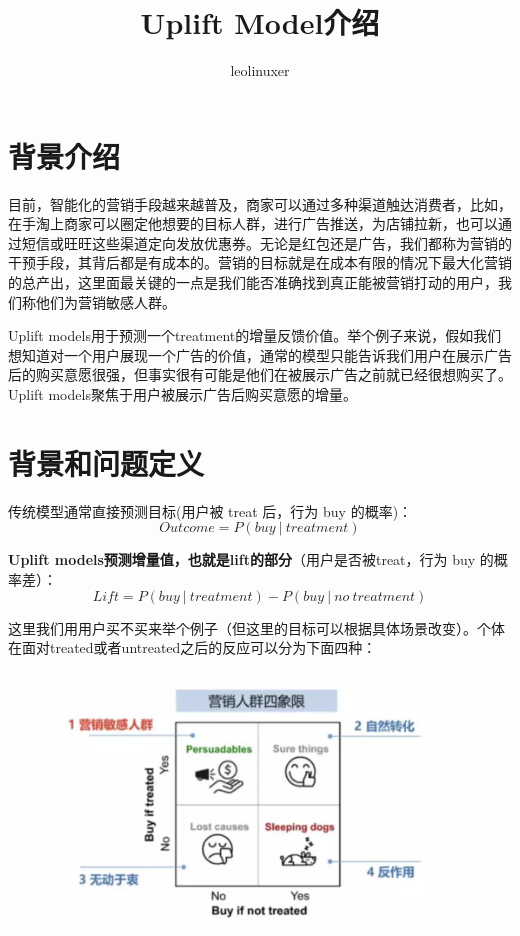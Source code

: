 \documentclass[12pt]{article}
\title{Uplift Model介绍\cite{Uplift_Model_In_One_Article}\cite{Uplift_Model_In_Ali}}
\author{leolinuxer}
\begin{document}
\maketitle
\tableofcontents

\section{背景介绍}
目前，智能化的营销手段越来越普及，商家可以通过多种渠道触达消费者，比如，在手淘上商家可以圈定他想要的目标人群，进行广告推送，为店铺拉新，也可以通过短信或旺旺这些渠道定向发放优惠券。无论是红包还是广告，我们都称为营销的干预手段，其背后都是有成本的。营销的目标就是在成本有限的情况下最大化营销的总产出，这里面最关键的一点是我们能否准确找到真正能被营销打动的用户，我们称他们为营销敏感人群。

Uplift models用于预测一个treatment的增量反馈价值。举个例子来说，假如我们想知道对一个用户展现一个广告的价值，通常的模型只能告诉我们用户在展示广告后的购买意愿很强，但事实很有可能是他们在被展示广告之前就已经很想购买了。Uplift models聚焦于用户被展示广告后购买意愿的增量。

\section{背景和问题定义}
传统模型通常直接预测目标(用户被 treat 后，行为 buy 的概率)：
$$
Outcome = P(buy \  | \ treatment)
$$


\textbf{Uplift models预测增量值，也就是lift的部分}（用户是否被treat，行为 buy 的概率差）：
$$
Lift = P(buy \  | \ treatment) - P(buy \ | \ no \ treatment)
$$

这里我们用用户买不买来举个例子（但这里的目标可以根据具体场景改变）。个体在面对treated或者untreated之后的反应可以分为下面四种：
\begin{figure}[H]
    \centering
    \includegraphics[width=.8\textwidth]{fig/CasualInference-Uplift-Model-Population.png}
\end{figure}
\end{document}
